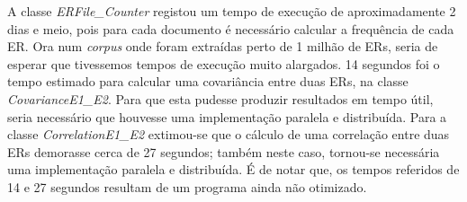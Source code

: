 A classe \textit{ERFile\_Counter} registou um tempo de execução de aproximadamente 2 dias e meio, pois para cada documento é necessário calcular a frequência de cada ER. Ora num \textit{corpus} onde foram extraídas perto de 1 milhão de ERs, seria de esperar que tivessemos tempos de execução muito alargados. 14 segundos foi o tempo estimado para calcular uma covariância entre duas ERs, na classe \textit{CovarianceE1\_E2}. Para que esta pudesse produzir resultados em tempo útil, seria necessário que houvesse uma implementação paralela e distribuída. Para a classe \textit{CorrelationE1\_E2} extimou-se que o cálculo de uma correlação entre duas ERs demorasse cerca de 27 segundos; também neste caso, tornou-se necessária uma implementação paralela e distribuída. É de notar que, os tempos referidos de 14 e 27 segundos resultam de um programa ainda não otimizado. 
